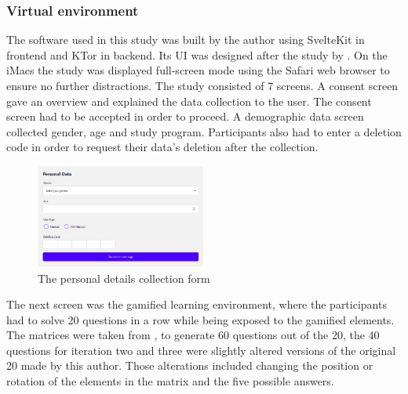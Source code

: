 \subsubsection{Virtual environment}
The software used in this study was built by the author using SvelteKit in frontend and KTor in backend. Its UI was designed after the study by \textcite{albuquerqueDoesGenderStereotype2017}.
On the iMacs the study was displayed full-screen mode using the Safari web browser to ensure no further distractions. The study consisted of 7 screens.
A consent screen gave an overview and explained the data collection to the user. The consent screen had to be accepted in order to proceed.
A demographic data screen collected gender, age and study program. Participants also had to enter a deletion code in order to request their data's deletion after the collection.
\begin{figure}[H]
  \centering
  \includegraphics[width=0.5\textwidth]{img/details.png}
  \caption{The personal details collection form}
  \label{fig:figureDetails}
\end{figure}
The next screen was the gamified learning environment, where the participants had to solve 20 questions in a row while being exposed to the gamified elements.
The matrices were taken from \textcite{albuquerqueDoesGenderStereotype2017}, to generate 60 questions out of the 20, the 40 questions for iteration two and three were slightly altered versions of the original 20 made by this author.
Those alterations included changing the position or rotation of the elements in the matrix and the five possible answers.
